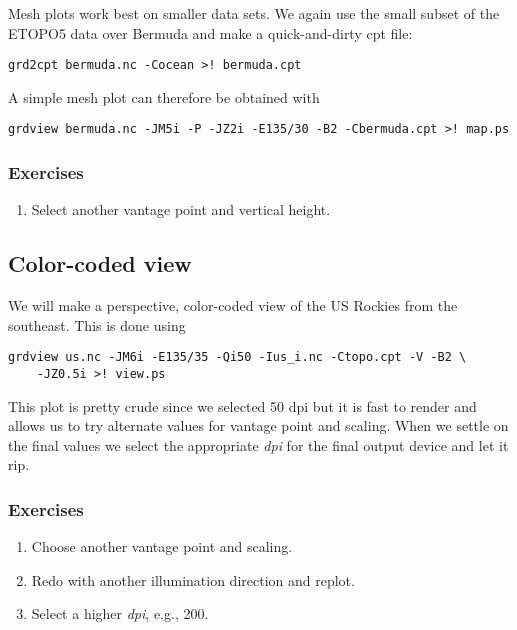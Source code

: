 \documentclass{report}
\begin{document}
Mesh plots work best on smaller data sets.  We again use the small
subset of the ETOPO5 data over Bermuda and make a quick-and-dirty
cpt file:

\begin{verbatim}
grd2cpt bermuda.nc -Cocean >! bermuda.cpt
\end{verbatim}

A simple mesh plot can therefore be obtained with

\begin{verbatim}
grdview bermuda.nc -JM5i -P -JZ2i -E135/30 -B2 -Cbermuda.cpt >! map.ps
\end{verbatim}


\subsubsection{Exercises}

\begin{enumerate}

\item Select another vantage point and vertical height.

\end{enumerate}

\subsection{Color-coded view}

We will make a perspective, color-coded view of the US Rockies
from the southeast.  This is done using

\begin{verbatim}
grdview us.nc -JM6i -E135/35 -Qi50 -Ius_i.nc -Ctopo.cpt -V -B2 \
    -JZ0.5i >! view.ps
\end{verbatim}

\noindent
This plot is pretty crude since we selected 50 dpi but it is fast
to render and allows us to try alternate values for vantage point
and scaling.  When we settle on the final values we select the
appropriate {\it dpi} for the final output device and let it rip.

\subsubsection{Exercises}

\begin{enumerate}

\item Choose another vantage point and scaling.

\item Redo  with another illumination direction and replot.

\item Select a higher {\it dpi}, e.g., 200.

\end{enumerate}
\end{document}
